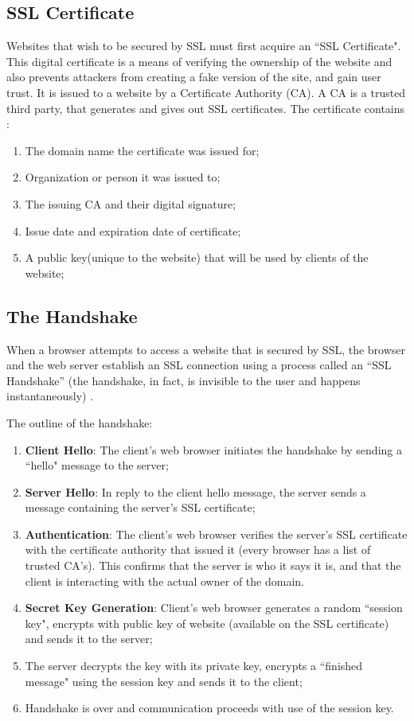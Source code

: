 \subsection{SSL Certificate} 
Websites that wish to be secured by SSL must first acquire an ``SSL Certificate". 
This digital certificate is a means of verifying the ownership of the website and also prevents attackers from creating a fake version of the site, and gain user trust. 
It is issued to a website by a Certificate Authority (CA). 
A CA is a trusted third party, that generates and gives out SSL certificates. The certificate contains \cite{cloudflare_certificate}:
\begin{enumerate}
    \item The domain name the certificate was issued for;
    \item Organization or person it was issued to;
    \item The issuing CA and their digital signature;
    \item Issue date and expiration date of certificate;
    \item A public key(unique to the website) that will be used by clients of the website;
\end{enumerate}

\subsection{The Handshake} 

When a browser attempts to access a website that is secured by SSL, the browser and the web server establish an SSL connection using a process called an “SSL Handshake” (the handshake, in fact, is invisible to the user and happens instantaneously) \cite{digicert, cloudflare_handshake}.

The outline of the handshake:

\begin{enumerate}
    \setlength\itemsep{1em}
    \item \textbf{Client Hello}: The client's web browser initiates the handshake by sending a ``hello" message to the server;
    \item \textbf{Server Hello}: In reply to the client hello message, the server sends a message containing the server's SSL certificate;
    \item \textbf{Authentication}: The client's web browser verifies the server's SSL certificate with the certificate authority that issued it (every browser has a list of trusted CA's). This confirms that the server is who it says it is, and that the client is interacting with the actual owner of the domain.
    \item \textbf{Secret Key Generation}: Client's web browser generates a random ``session key",  encrypts with public key of website (available on the SSL certificate) and sends it to the server;
    \item The server decrypts the key with its private key, encrypts a ``finished message" using the session key and sends it to the client;
    \item Handshake is over and communication proceeds with use of the session key.
\end{enumerate}
